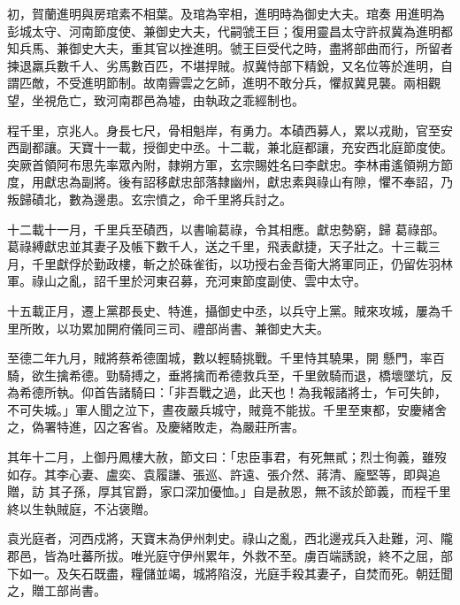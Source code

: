 \begin{pinyinscope}
 初，賀蘭進明與房琯素不相葉。及琯為宰相，進明時為御史大夫。琯奏
 用進明為彭城太守、河南節度使、兼御史大夫，代嗣虢王巨；復用靈昌太守許叔冀為進明都知兵馬、兼御史大夫，重其官以挫進明。虢王巨受代之時，盡將部曲而行，所留者揀退羸兵數千人、劣馬數百匹，不堪捍賊。叔冀恃部下精銳，又名位等於進明，自謂匹敵，不受進明節制。故南霽雲之乞師，進明不敢分兵，懼叔冀見襲。兩相觀望，坐視危亡，致河南郡邑為墟，由執政之乖經制也。



 程千里，京兆人。身長七尺，骨相魁岸，有勇力。本磧西募人，累以戎勛，官至安西副都讓。天寶十一載，授御史中丞。十二載，兼北庭都讓，充安西北庭節度使。突厥首領阿布思先率眾內附，隸朔方軍，玄宗賜姓名曰李獻忠。李林甫遙領朔方節度，用獻忠為副將。後有詔移獻忠部落隸幽州，獻忠素與祿山有隙，懼不奉詔，乃叛歸磧北，數為邊患。玄宗憤之，命千里將兵討之。



 十二載十一月，千里兵至磧西，以書喻葛祿，令其相應。獻忠勢窮，歸
 葛祿部。葛祿縛獻忠並其妻子及帳下數千人，送之千里，飛表獻捷，天子壯之。十三載三月，千里獻俘於勤政樓，斬之於硃雀街，以功授右金吾衛大將軍同正，仍留佐羽林軍。祿山之亂，詔千里於河東召募，充河東節度副使、雲中太守。



 十五載正月，遷上黨郡長史、特進，攝御史中丞，以兵守上黨。賊來攻城，屢為千里所敗，以功累加開府儀同三司、禮部尚書、兼御史大夫。



 至德二年九月，賊將蔡希德圍城，數以輕騎挑戰。千里恃其驍果，開
 懸門，率百騎，欲生擒希德。勁騎搏之，垂將擒而希德救兵至，千里斂騎而退，橋壞墜坑，反為希德所執。仰首告諸騎曰：「非吾戰之過，此天也！為我報諸將士，乍可失帥，不可失城。」軍人聞之泣下，晝夜嚴兵城守，賊竟不能拔。千里至東都，安慶緒舍之，偽署特進，囚之客省。及慶緒敗走，為嚴莊所害。



 其年十二月，上御丹鳳樓大赦，節文曰：「忠臣事君，有死無貳；烈士徇義，雖歿如存。其李心妻、盧奕、袁履謙、張巡、許遠、張介然、蔣清、龐堅等，即與追贈，訪
 其子孫，厚其官爵，家口深加優恤。」自是赦恩，無不該於節義，而程千里終以生執賊庭，不沾褒贈。



 袁光庭者，河西戍將，天寶末為伊州刺史。祿山之亂，西北邊戎兵入赴難，河、隴郡邑，皆為吐蕃所拔。唯光庭守伊州累年，外救不至。虜百端誘說，終不之屈，部下如一。及矢石既盡，糧儲並竭，城將陷沒，光庭手殺其妻子，自焚而死。朝廷聞之，贈工部尚書。




\end{pinyinscope}
